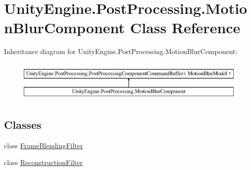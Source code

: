 \hypertarget{class_unity_engine_1_1_post_processing_1_1_motion_blur_component}{}\section{Unity\+Engine.\+Post\+Processing.\+Motion\+Blur\+Component Class Reference}
\label{class_unity_engine_1_1_post_processing_1_1_motion_blur_component}
Inheritance diagram for Unity\+Engine.\+Post\+Processing.\+Motion\+Blur\+Component\+:\begin{figure}[H]
\begin{center}
\leavevmode
\includegraphics[height=2.000000cm]{class_unity_engine_1_1_post_processing_1_1_motion_blur_component}
\end{center}
\end{figure}
\subsection*{Classes}
\begin{DoxyCompactItemize}
\item 
class \mbox{\hyperlink{class_unity_engine_1_1_post_processing_1_1_motion_blur_component_1_1_frame_blending_filter}{Frame\+Blending\+Filter}}
\item 
class \mbox{\hyperlink{class_unity_engine_1_1_post_processing_1_1_motion_blur_component_1_1_reconstruction_filter}{Reconstruction\+Filter}}
\end{DoxyCompactItemize}
